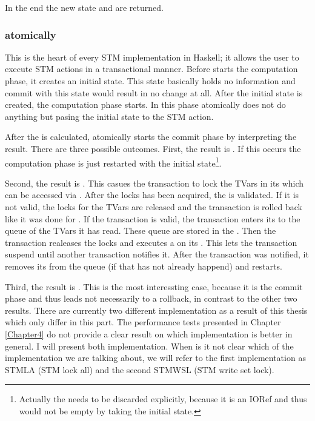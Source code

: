In the end the new state and \code{()} are returned.

\subsubsection{atomically}
This is the heart of every STM implementation in Haskell; it allows the user to execute STM 
actions in a transactional manner. Before  starts the computation phase, it
creates an initial state. This state basically holds no information and commit with this state
would result in no change at all. After the initial state is created, the computation phase starts. 
In this phase atomically does not do anything but pasing the initial state to the STM action.

After the  is calculated, atomically starts the commit phase by interpreting
the result. There are three possible outcomes.
First, the result is . If this occurs the computation phase is just restarted 
with the initial state\footnote{Actually the  needs to be discarded explicitly,
because it is an IORef and thus would not be empty by taking the initial state.}. 

Second, the result is . This casues the transaction to lock the TVars in its 
 which can be accessed via . After the locks has been acquired, 
the  is validated. If it is not valid, the locks for the TVars are released and
the transaction is rolled back like it was done for . If the transaction is 
valid, the transaction enters its  to the queue of the TVars it has read.
These queue are stored in the . Then the transaction realeases the locks and 
executes a  on its . This lets the transaction suspend until
another transaction notifies it. After the transaction was notified, it removes its 
 from the queue (if that has not already happend) and restarts.

Third, the result is . This is the most interessting case, 
because it is the commit phase and thus leads not necessarily to a rollback, in contrast to 
the other two results. 
There are currently two different implementation as a result of this thesis which 
only differ in this part. The performance tests presented in Chapter \ref{Chapter4} do
not provide a clear result on which implementation is better in general. I will present
both implementation. When is it not clear which of the implementation we are talking about,
we will refer to the first implementation as STMLA (STM lock all) and the second STMWSL 
(STM write set lock). 

